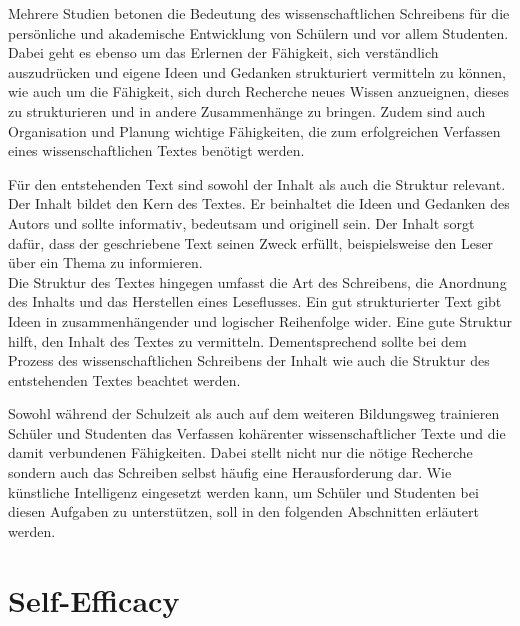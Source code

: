 \documentclass[../main.tex]{subfiles}
\begin{document}
Mehrere Studien betonen die Bedeutung des wissenschaftlichen Schreibens für die persönliche und akademische Entwicklung 
von Schülern und vor allem Studenten\cite{influencingUsingAi,ZukunftWissenschaftlichesPublizieren}. Dabei geht es ebenso um das Erlernen der Fähigkeit, sich verständlich auszudrücken und 
eigene Ideen und Gedanken strukturiert vermitteln zu können, wie auch um die Fähigkeit, sich durch Recherche neues Wissen 
anzueignen, dieses zu strukturieren und in andere Zusammenhänge zu bringen. Zudem sind auch Organisation und Planung 
wichtige Fähigkeiten, die zum erfolgreichen Verfassen eines wissenschaftlichen Textes benötigt werden.\cite{SelfEfficacyBeliefs} 

Für den entstehenden Text sind sowohl der Inhalt als auch die Struktur relevant. Der Inhalt bildet den Kern des Textes. Er beinhaltet die Ideen und Gedanken des Autors und sollte 
informativ, bedeutsam und originell sein. Der Inhalt sorgt dafür, dass der geschriebene Text seinen Zweck erfüllt, beispielsweise 
den Leser über ein Thema zu informieren. \\
Die Struktur des Textes hingegen umfasst die Art des Schreibens, die Anordnung des Inhalts und das Herstellen eines Leseflusses. 
Ein gut strukturierter Text gibt Ideen in zusammenhängender und logischer Reihenfolge wider. Eine gute Struktur hilft, den Inhalt des
Textes zu vermitteln. Dementsprechend sollte bei dem Prozess des wissenschaftlichen Schreibens der Inhalt wie auch die Struktur des entstehenden 
Textes beachtet werden.\cite{teachers}

Sowohl während der Schulzeit als auch auf dem weiteren Bildungsweg trainieren Schüler und Studenten das Verfassen kohärenter 
wissenschaftlicher Texte und die damit verbundenen Fähigkeiten. Dabei stellt nicht nur die nötige Recherche sondern auch das Schreiben selbst
häufig eine Herausforderung dar. Wie künstliche Intelligenz eingesetzt werden kann, um Schüler und Studenten bei diesen Aufgaben zu 
unterstützen, soll in den folgenden Abschnitten erläutert werden. 

\section{Self-Efficacy}
\end{document}
